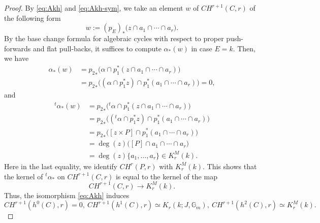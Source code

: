 \documentclass[10pt,a4paper]{amsart}
\newcommand{\Gm}{\mathbb{G}_{m}}
\begin{document}
\begin{proof}
    By \eqref{eq:Akh} and \eqref{eq:Akh-sym}, we take an element $w$ of $CH^{r+1}(C,r)$ of the following form
    $$
    w:=(p_E)_\ast\bigl(z\cap a_1\cap\cdots\cap a_r\bigr).
    $$
    By the base change formula for algebraic cycles with respect to proper push-forwards and flat pull-backs, it suffices to compute $\alpha_\ast(w)$ in case $E=k$.
    Then, we have
    \begin{align}
        \alpha_\ast(w)
        &={p_2}_\ast\bigl(\alpha\cap p_1^\ast(z\cap a_1\cap\cdots\cap a_r)\bigr)\\
        &={p_2}_\ast\bigl((\alpha\cap p_1^\ast z)\cap p_1^\ast(a_1\cap\cdots\cap a_r)\bigr)=0,
    \end{align}
    and
    \begin{align}
        {}^t\alpha_\ast(w)
        &={p_2}_\ast\bigl({}^t\alpha\cap p_1^\ast(z\cap a_1\cap\cdots\cap a_r)\bigr)\\
        &={p_2}_\ast\bigl(({}^t\alpha\cap p_1^\ast z)\cap p_1^\ast(a_1\cap\cdots\cap a_r)\bigr)\\
        &={p_2}_\ast\bigl([z\times P]\cap p_1^\ast(a_1\cap\cdots\cap a_r)\bigr)\\
        &=\deg(z)\bigl([P]\cap a_1\cap\cdots\cap a_r\bigr)\\
        &=\deg(z)\{a_1, \dots, a_r\}\in K_r^M(k).
    \end{align}
    Here in the last equality, we identify $CH^r(P,r)$ with $K^M_r(k)$.
    This shows that the kernel of ${}^t\alpha_\ast$ on $CH^{r+1}(C,r)$ is equal to the kernel of the map
    $$
    CH^{r+1}(C,r)\to K_r^M(k).
    $$
    Thus, the isomorphism \eqref{eq:Akh} induces
    $$
    CH^{r+1}(h^0(C),r)=0,\ CH^{r+1}(h^1(C),r)\simeq K_r(k;J,\Gm),\ CH^{r+1}(h^2(C),r)\simeq K_r^M(k).
    $$
\end{proof}
\end{document}
